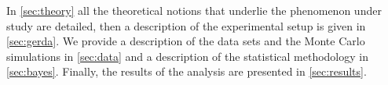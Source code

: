 	In \cref{sec:theory} all the theoretical notions that underlie the phenomenon under study are detailed, then a description of the {\gerda} experimental setup is given in \cref{sec:gerda}. We provide a description of the data sets and the Monte Carlo simulations in \cref{sec:data} and a description of the statistical methodology in \cref{sec:bayes}. Finally, the results of the analysis are presented in \cref{sec:results}.
